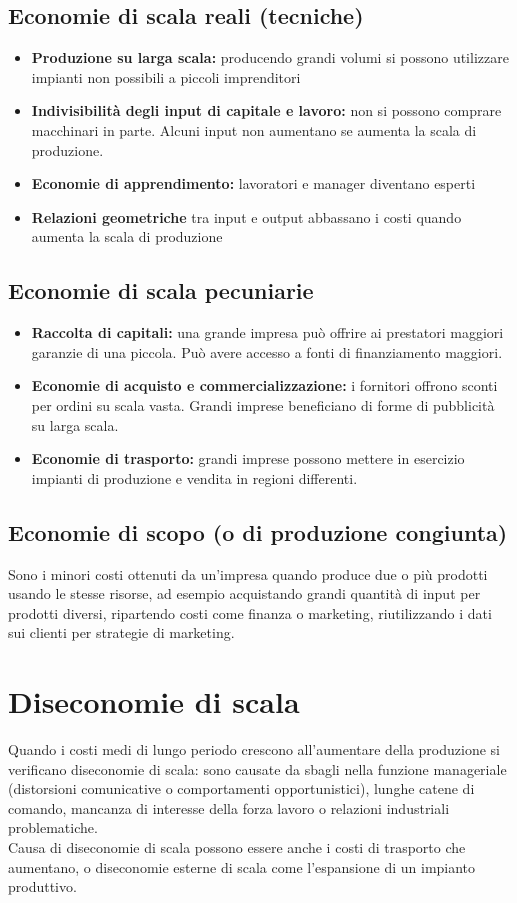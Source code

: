 \documentclass{report}
\begin{document}
	\subsection{Economie di scala reali (tecniche)}
	\begin{itemize}
		\item \textbf{Produzione su larga scala:} producendo grandi volumi si possono utilizzare impianti non possibili a piccoli imprenditori
		\item \textbf{Indivisibilità degli input di capitale e lavoro:} non si possono comprare macchinari in parte. Alcuni input non aumentano se aumenta la scala di produzione.
		\item \textbf{Economie di apprendimento:} lavoratori e manager diventano esperti
		\item \textbf{Relazioni geometriche} tra input e output abbassano i costi quando aumenta la scala di produzione
	\end{itemize}
	\subsection{Economie di scala pecuniarie}
	\begin{itemize}
		\item \textbf{Raccolta di capitali:} una grande impresa può offrire ai prestatori maggiori garanzie di una piccola. Può avere accesso a fonti di finanziamento maggiori.
		\item \textbf{Economie di acquisto e commercializzazione:} i fornitori offrono sconti per ordini su scala vasta. Grandi imprese beneficiano di forme di pubblicità su larga scala.
		\item \textbf{Economie di trasporto:} grandi imprese possono mettere in esercizio impianti di produzione e vendita in regioni differenti.
	\end{itemize}
	\subsection{Economie di scopo (o di produzione congiunta)}
	Sono i minori costi ottenuti da un'impresa quando produce due o più prodotti usando le stesse risorse, ad esempio acquistando grandi quantità di input per prodotti diversi, ripartendo costi come finanza o marketing, riutilizzando i dati sui clienti per strategie di marketing.
	\section{Diseconomie di scala}
	Quando i costi medi di lungo periodo crescono all'aumentare della produzione si verificano diseconomie di scala: sono causate da sbagli nella funzione manageriale (distorsioni comunicative o comportamenti opportunistici), lunghe catene di comando, mancanza di interesse della forza lavoro o relazioni industriali problematiche.
	\medskip \\
	Causa di diseconomie di scala possono essere anche i costi di trasporto che aumentano, o diseconomie esterne di scala come l'espansione di un impianto produttivo.
\end{document}

